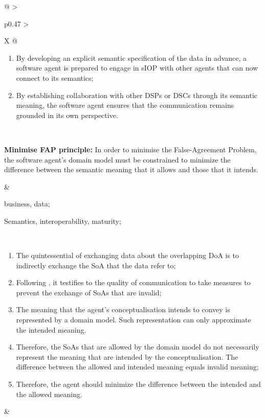 \begin{xltabular}[l]{\linewidth}{@{} >{\small\raggedright\arraybackslash}p{0.47\linewidth} >{\small\raggedright\arraybackslash}X @{}}
\begin{enumerate}[left=10pt, nosep]
  \item By developing an explicit semantic specification of the data in advance, a software agent is prepared to engage in sIOP with other agents that can now connect to its semantics;
  \item By establishing collaboration with other DSPs or DSCs through its semantic meaning, the software agent ensures that the communication remains grounded in its own perspective.
\end{enumerate} \\
%
%
%
\begin{mmdp}\label{dp:mfapp}{\bfseries Minimise FAP principle:}
\quad In order to minimise the False-Agreement Problem, the software agent's domain model must be constrained to minimize the difference between the semantic meaning that it allows and those that it intends.
\end{mmdp}
&
\begin{description}[labelwidth=3.7cm,leftmargin=3.7cm+1ex,nosep,topsep=2ex,labelsep=1ex,font=\bfseries]
  \item[Type of information:] business, data;
  \item[Quality attributes:] Semantics, interoperability, maturity;
\end{description} \\
\begin{enumerate}[left=6pt, nosep]
  \item The quintessential of exchanging data about the overlapping DoA is to indirectly exchange the SoA that the data refer to;
  \item Following \cite{Grice:1991BT}, it testifies to the quality of communication to take measures to prevent the exchange of SoAs that are invalid;
  \item The meaning that the agent's conceptualisation intends to convey is represented by a domain model. Such representation can only approximate the intended meaning. 
  \item Therefore, the SoAs that are allowed by the domain model do not necessarily represent the meaning that are intended by the conceptualisation. The difference between the allowed and intended meaning equals invalid meaning;
  \item Therefore, the agent should minimize the difference between the intended and the allowed meaning.
\end{enumerate}
&
\begin{enumerate}[left=10pt, nosep]

\end{enumerate}
\end{xltabular}
